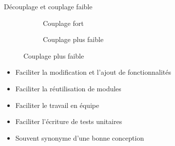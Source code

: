 \documentclass[xcolor=table]{beamer}
\begin{document}
\begin{frame}{Découplage et couplage faible}
\begin{figure}
    \centering
    \begin{subfigure}{0.48\linewidth}
        \centering
        \caption*{Couplage fort}
    \end{subfigure}
    \begin{subfigure}{0.48\linewidth}
        \centering
        \caption*{Couplage plus faible}
    \end{subfigure}
\end{figure}
\begin{itemize}
    \item Faciliter la modification et l'ajout de fonctionnalités
    \item Faciliter la réutilisation de modules
    \item Faciliter le travail en équipe
    \item Faciliter l'écriture de tests unitaires
    \item Souvent synonyme d'une bonne conception
\end{itemize}
\end{frame}

\end{document}
